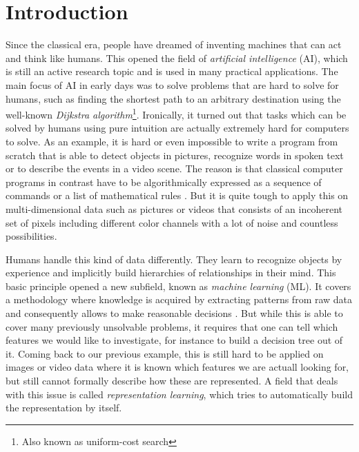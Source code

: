 

\chapter{Introduction} \label{chapter:introduction}

Since the classical era, people have dreamed of inventing machines that can act and think like humans. This opened the field of \textit{artificial intelligence} (AI), which is still an active research topic and is used in many practical applications. The main focus of AI in early days was to solve problems that are hard to solve for humans, such as finding the shortest path to an arbitrary destination using the well-known \textit{Dijkstra algorithm}\footnote{Also known as uniform-cost search}. Ironically, it turned out that tasks which can be solved by humans using pure intuition are actually extremely hard for computers to solve. As an example, it is hard or even impossible to write a program from scratch that is able to detect objects in pictures, recognize words in spoken text or to describe the events in a video scene. The reason is that classical computer programs in contrast have to be algorithmically expressed as a sequence of commands or a list of mathematical rules \parencite{deep_learning}. But it is quite tough to apply this on multi-dimensional data such as pictures or videos that consists of an incoherent set of pixels including different color channels with a lot of noise and countless possibilities. 

Humans handle this kind of data differently. They learn to recognize objects by experience and implicitly build hierarchies of relationships in their mind. This basic principle opened a new subfield, known as \textit{machine learning} (ML). It covers a methodology where knowledge is acquired by extracting patterns from raw data and consequently allows to make reasonable decisions \parencite{deep_learning}. But while this is able to cover many previously unsolvable problems, it requires that one can tell which features we would like to investigate, for instance to build a decision tree out of it. Coming back to our previous example, this is still hard to be applied on images or video data where it is known which features we are actuall looking for, but still cannot formally describe how these are represented. A field that deals with this issue is called \textit{representation learning}, which tries to automatically build the representation by itself.

